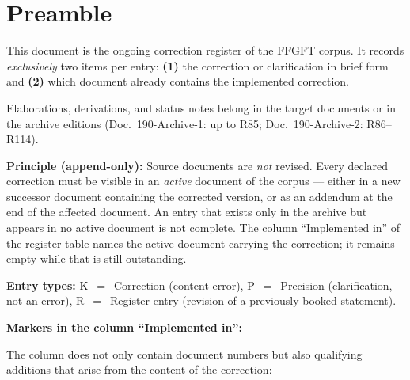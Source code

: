 
\providecommand{\QM}{\textbf{[Q]}}

\section*{Preamble}

This document is the ongoing correction register of the FFGFT corpus.
It records \emph{exclusively} two items per entry:
\textbf{(1)} the correction or clarification in brief form and
\textbf{(2)} which document already contains the implemented correction.

Elaborations, derivations, and status notes belong in the target documents
or in the archive editions (Doc.~190-Archive-1: up to R85; Doc.~190-Archive-2: R86–R114).

\textbf{Principle (append-only):} Source documents are \emph{not} revised.
Every declared correction must be visible in an \emph{active} document of the
corpus --- either in a new successor document containing the corrected version,
or as an addendum at the end of the affected document.
An entry that exists only in the archive but appears in no active document
is not complete. The column ``Implemented in'' of the register table names
the active document carrying the correction; it remains empty while that
is still outstanding.

\textbf{Entry types:}
K~$=$~Correction (content error),
P~$=$~Precision (clarification, not an error),
R~$=$~Register entry (revision of a previously booked statement).

\textbf{Markers in the column ``Implemented in'':}

The column does not only contain document numbers but also qualifying
additions that arise from the content of the correction:

